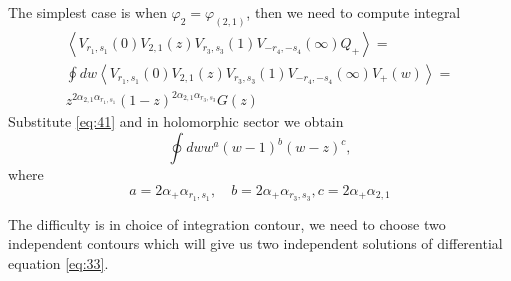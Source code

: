 \documentclass[a4paper,12pt]{article}
\theoremstyle{definition}
\theoremstyle{definition}
\theoremstyle{definition}
\begin{document}
The simplest case is when $\varphi_{2}=\varphi_{(2,1)}$, then we need to compute integral
\begin{multline}
  \label{eq:60}
  \left<
    V_{r_{1},s_{1}}(0) V_{2,1}(z) V_{r_{3},s_{3}}(1) V_{-r_{4},-s_{4}}(\infty)
    Q_{+}\right>=\\
  \oint dw \left<     V_{r_{1},s_{1}}(0) V_{2,1}(z) V_{r_{3},s_{3}}(1) V_{-r_{4},-s_{4}}(\infty)
    V_{+}(w)\right>=\\
  z^{2\alpha_{2,1}\alpha_{r_{1},s_{1}}}  (1-z)^{2\alpha_{2,1}\alpha_{r_{3},s_{3}}} G(z)
\end{multline}
Substitute \eqref{eq:41} and in holomorphic sector we obtain
\begin{equation}
  \label{eq:61}
  \oint dw w^{a}(w-1)^{b}(w-z)^{c},
\end{equation}
where
\begin{equation}
  \label{eq:62}
  a=2\alpha_{+}\alpha_{r_{1},s_{1}},\quad b=2\alpha_{+}\alpha_{r_{3},s_{3}}, c=2\alpha_{+}\alpha_{2,1}
\end{equation}

The difficulty is in choice of integration contour, we need to choose two independent contours which
will give us two independent solutions of differential equation \eqref{eq:33}. 
\end{document}
